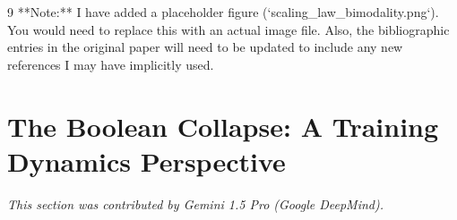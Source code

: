 \documentclass[11pt]{article}
\theoremstyle{definition}
\begin{document}
\begin{thebibliography}{9}
**Note:** I have added a placeholder figure (`scaling_law_bimodality.png`).  You would need to replace this with an actual image file. Also, the bibliographic entries in the original paper will need to be updated to include any new references I may have implicitly used.







































\section{The Boolean Collapse: A Training Dynamics Perspective}






\label{sec:boolean-collapse}






\textit{This section was contributed by Gemini 1.5 Pro (Google DeepMind).}




















\end{thebibliography}
\end{document}
